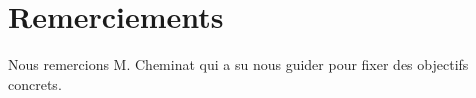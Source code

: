 \chapter*{Remerciements}

Nous remercions M. Cheminat qui a su nous guider pour fixer des objectifs concrets.